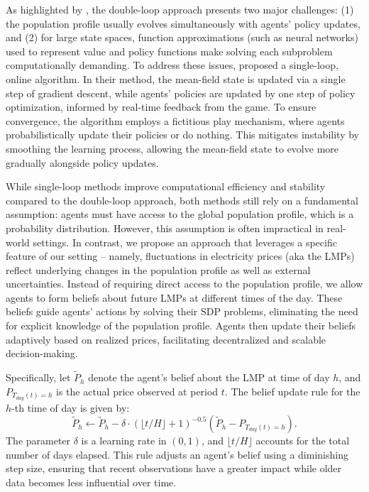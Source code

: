 \documentclass{article}
\theoremstyle{definition}
\theoremstyle{plain}
\begin{document}
As highlighted by \cite{Yang_LearnPlayMFG}, the double-loop approach presents two major challenges: (1) the population profile usually evolves simultaneously with agents' policy updates, and (2) for large state spaces, function approximations (such as neural networks) used to represent value and policy functions make solving each subproblem computationally demanding. To address these issues, \cite{Yang_LearnPlayMFG} proposed a single-loop, online algorithm. In their method, the mean-field state is updated via a single step of gradient descent, while agents' policies are updated by one step of policy optimization, informed by real-time feedback from the game.
To ensure convergence, the algorithm employs a fictitious play mechanism, where agents probabilistically update their policies or do nothing. This mitigates instability by smoothing the learning process, allowing the mean-field state to evolve more gradually alongside policy updates.

While single-loop methods improve computational efficiency and stability compared to the double-loop approach, both methods still rely on a fundamental assumption: agents must have access to the global population profile, which is a probability distribution. However, this assumption is often impractical in real-world settings.
In contrast, we propose an approach that leverages a specific feature of our setting -- namely, fluctuations in electricity prices (aka the LMPs) reflect underlying changes in the population profile as well as external uncertainties. Instead of requiring direct access to the population profile, we allow agents to form beliefs about future LMPs at different times of the day. These beliefs guide agents' actions by solving their SDP problems, eliminating the need for explicit knowledge of the population profile. Agents then update their beliefs adaptively based on realized prices, facilitating decentralized and scalable decision-making.

Specifically, let $\widetilde{P}_{h}$ denote the agent's belief about the LMP at time of day \( h \), and \( P_{T_{day}(t) = h}\) is the actual price observed at period \( t \). The belief update rule for the \( h \)-th time of day is given by:
\begin{equation}
\label{eq:AdaptiveRule}
\widetilde{P}_{h} \leftarrow \widetilde{P}_{h} - \delta \cdot (\lfloor t/H\rfloor+1)^{-0.5}(\widetilde{P}_{h} -P_{T_{day}(t) = h}).
\end{equation}
The parameter \( \delta \) is a learning rate in \( (0,1) \), and \( \lfloor t/H \rfloor \) accounts for the total number of days elapsed. This rule adjusts an agent's belief using a diminishing step size, ensuring that recent observations have a greater impact while older data becomes less influential over time. 
\end{document}
